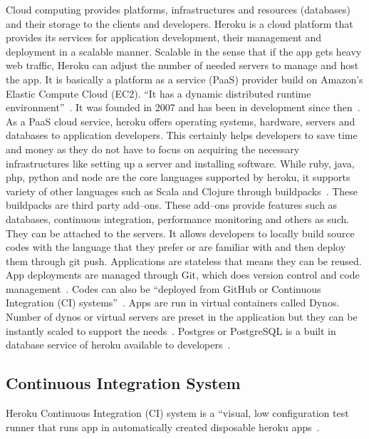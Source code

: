  Cloud computing provides platforms, infrastructures and resources (databases)
 and their storage to the clients and developers. Heroku is a cloud platform 
 that provides its services for application development, their management and
 deployment in a scalable manner. Scalable in the sense that if the app gets 
 heavy web traffic, Heroku can 
 adjust the number of needed servers to manage and host the app. It is 
 basically a platform as a service (PaaS) provider build on Amazon's 
 Elastic Compute Cloud (EC2). ``It has a dynamic distributed runtime 
 environment''~\cite{hid-sp18-415-www-devcenter-heroku}. It was founded in  2007 and has been
 in development since then~\cite{hid-sp18-415-www-wikipedia-org}.
 As a PaaS cloud service, heroku
 offers operating systems, hardware, servers and databases to application 
 developers. This certainly helps developers to save time and money as they do
 not have to focus on acquiring the necessary infrastructures like setting up 
 a server and installing software. While ruby, java, php, python and node are 
 the core languages supported by heroku, it supports variety 
 of other languages such as Scala and Clojure through buildpacks~\cite{hid-sp18-415-www-wikipedia-org}.
 These buildpacks are third party add--ons. These add--ons provide features such as
 databases, continuous integration, performance monitoring and others as such. 
 They can be attached to the servers. It allows developers to locally build 
 source codes with the language that they prefer or are familiar with and then
 deploy them through git push. Applications are stateless that means they can 
be reused. App deployments are managed through Git, which does version control
 and code management~\cite{hid-sp18-415-www-how-heroku-works}. Codes can also be ``deployed 
from GitHub or Continuous Integration (CI) systems''~\cite{hid-sp18-415-www-heroku-com}.   
Apps are run in virtual containers called Dynos. Number of dynos or virtual 
servers are preset in the application but they can be instantly scaled to 
support the needs~\cite{hid-sp18-415-www-how-heroku-works}. Postgres or PostgreSQL is a 
built in database service of heroku available to developers~\cite{hid-sp18-415-www-heroku-com}.

\subsection{Continuous Integration System}
 Heroku Continuous Integration (CI) system is a ``visual, low configuration
 test runner that runs app in automatically created disposable 
 heroku apps~\cite{hid-sp18-415-www-heroku-ci}. 


